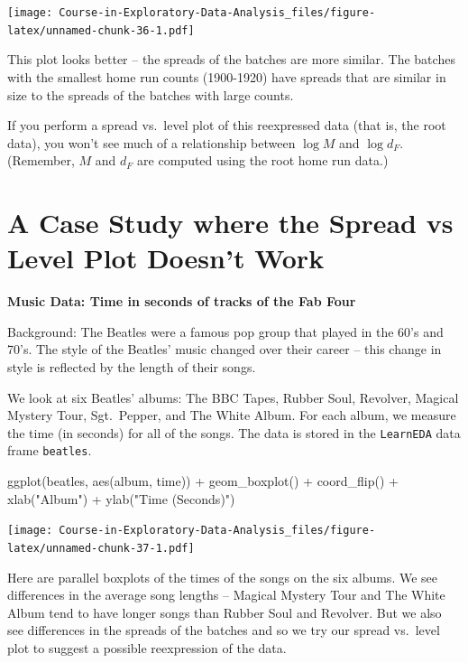 \documentclass[
]{book}
\newenvironment{Shaded}{\begin{snugshade}}{\end{snugshade}}
\newcommand{\FunctionTok}[1]{\textcolor[rgb]{0.00,0.00,0.00}{#1}}
\newcommand{\NormalTok}[1]{#1}
\newcommand{\SpecialCharTok}[1]{\textcolor[rgb]{0.00,0.00,0.00}{#1}}
\newcommand{\StringTok}[1]{\textcolor[rgb]{0.31,0.60,0.02}{#1}}
\begin{document}
\texttt{[image: Course-in-Exploratory-Data-Analysis\_files/figure-latex/unnamed-chunk-36-1.pdf]}

This plot looks better -- the spreads of the batches are more similar. The batches with the smallest home run counts (1900-1920) have spreads that are similar in size to the spreads of the batches with large counts.

If you perform a spread vs.~level plot of this reexpressed data (that is, the root data), you won't see much of a relationship between \(\log M\) and \(\log d_F\). (Remember, \(M\) and \(d_F\) are computed using the root home run data.)

\hypertarget{a-case-study-where-the-spread-vs-level-plot-doesnt-work}{%
\section{A Case Study where the Spread vs Level Plot Doesn't Work}\label{a-case-study-where-the-spread-vs-level-plot-doesnt-work}}

\textbf{Music Data: Time in seconds of tracks of the Fab Four}

Background: The Beatles were a famous pop group that played in the 60's and 70's. The style of the Beatles' music changed over their career -- this change in style is reflected by the length of their songs.

We look at six Beatles' albums: The BBC Tapes, Rubber Soul, Revolver, Magical Mystery Tour, Sgt.~Pepper, and The White Album. For each album, we measure the time (in seconds) for all of the songs. The data is stored in the \texttt{LearnEDA} data frame \texttt{beatles}.

\begin{Shaded}
\begin{Highlighting}[]
\FunctionTok{ggplot}\NormalTok{(beatles, }\FunctionTok{aes}\NormalTok{(album, time)) }\SpecialCharTok{+}
  \FunctionTok{geom\_boxplot}\NormalTok{() }\SpecialCharTok{+} \FunctionTok{coord\_flip}\NormalTok{() }\SpecialCharTok{+}
  \FunctionTok{xlab}\NormalTok{(}\StringTok{"Album"}\NormalTok{) }\SpecialCharTok{+}
  \FunctionTok{ylab}\NormalTok{(}\StringTok{"Time (Seconds)"}\NormalTok{)}
\end{Highlighting}
\end{Shaded}

\texttt{[image: Course-in-Exploratory-Data-Analysis\_files/figure-latex/unnamed-chunk-37-1.pdf]}

Here are parallel boxplots of the times of the songs on the six albums. We see differences in the average song lengths -- Magical Mystery Tour and The White Album tend to have longer songs than Rubber Soul and Revolver. But we also see differences in the spreads of the batches and so we try our spread vs.~level plot to suggest a possible reexpression of the data.
\end{document}
